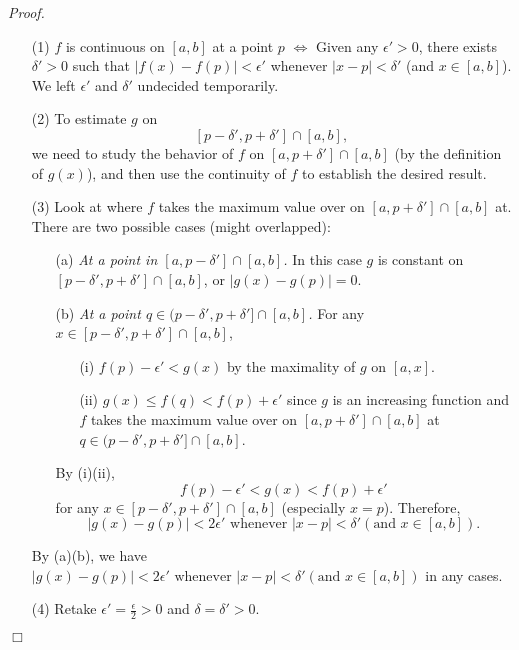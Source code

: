 \documentclass{article}
\begin{document}
\emph{Proof.}
\begin{enumerate}
\item[(1)]
$f$ is continuous on $[a,b]$ at a point $p$ $\Longleftrightarrow$
Given any $\epsilon' > 0$, there exists $\delta' > 0$ such that
$|f(x) - f(p)| < \epsilon'$ whenever $|x-p| < \delta'$ (and $x \in [a,b]$).
We left $\epsilon'$ and $\delta'$ undecided temporarily.
\item[(2)]
To estimate $g$ on
$$[p-\delta', p+\delta'] \cap [a,b],$$
we need to study the behavior of $f$ on $[a,p+\delta'] \cap [a,b]$
(by the definition of $g(x)$),
and then use the continuity of $f$ to establish the desired result.
\item[(3)]
Look at where $f$ takes the maximum value over on $[a,p+\delta'] \cap [a,b]$ at.
There are two possible cases (might overlapped):
  \begin{enumerate}
  \item[(a)]
  \emph{At a point in $[a,p-\delta'] \cap [a,b]$.}
  In this case $g$ is constant on $[p-\delta', p+\delta'] \cap [a,b]$,
  or $|g(x) - g(p)| = 0$.
  \item[(b)]
  \emph{At a point $q \in (p-\delta',p+\delta'] \cap [a,b]$.}
  For any $x \in [p-\delta', p+\delta'] \cap [a,b]$,
    \begin{enumerate}
    \item[(i)]
    $f(p) - \epsilon' < g(x)$ by the maximality of $g$ on $[a,x]$.
    \item[(ii)]
    $g(x) \leq f(q) < f(p) + \epsilon'$
    since $g$ is an increasing function and
    $f$ takes the maximum value over on $[a,p+\delta'] \cap [a,b]$ at
    $q \in (p-\delta',p+\delta'] \cap [a,b]$.
    \end{enumerate}
  By (i)(ii),
  $$f(p) - \epsilon' < g(x) < f(p) + \epsilon'$$
  for  any $x \in [p-\delta', p+\delta'] \cap [a,b]$ (especially $x = p$).
  Therefore,
  $$|g(x) - g(p)| < 2 \epsilon'
  \text{ whenever } |x-p| < \delta' (\text{and } x \in [a,b]).$$

  \end{enumerate}
  By (a)(b), we have
  $|g(x) - g(p)| < 2 \epsilon'
  \text{ whenever } |x-p| < \delta' (\text{and } x \in [a,b])$ in any cases.
\item[(4)]
Retake $\epsilon' = \frac{\epsilon}{2} > 0$ and $\delta = \delta' > 0$.
\end{enumerate}
$\Box$ \\\\
\end{document}
